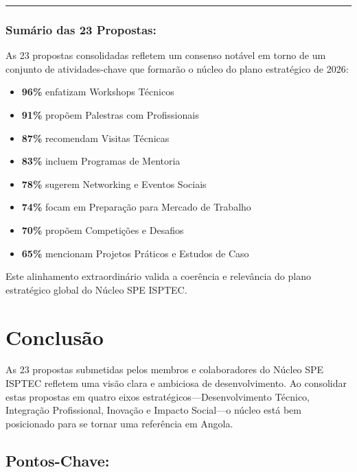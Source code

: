 \documentclass[12pt,a4paper]{article}
\begin{document}
\textcolor{spe-secondary}{\hspace{0.5cm}\rule{0.4\linewidth}{0.8pt}}

\subsubsection*{Sumário das 23 Propostas:}

As 23 propostas consolidadas refletem um consenso notável em torno de um conjunto de atividades-chave que formarão o núcleo do plano estratégico de 2026:

\begin{itemize}[itemsep=0.1cm]
    \item \textbf{96\%} enfatizam Workshops Técnicos
    \item \textbf{91\%} propõem Palestras com Profissionais
    \item \textbf{87\%} recomendam Visitas Técnicas
    \item \textbf{83\%} incluem Programas de Mentoria
    \item \textbf{78\%} sugerem Networking e Eventos Sociais
    \item \textbf{74\%} focam em Preparação para Mercado de Trabalho
    \item \textbf{70\%} propõem Competições e Desafios
    \item \textbf{65\%} mencionam Projetos Práticos e Estudos de Caso
\end{itemize}

Este alinhamento extraordinário valida a coerência e relevância do plano estratégico global do Núcleo SPE ISPTEC.

\newpage
\section{Conclusão}

As 23 propostas submetidas pelos membros e colaboradores do Núcleo SPE ISPTEC refletem uma visão clara e ambiciosa de desenvolvimento. Ao consolidar estas propostas em quatro eixos estratégicos—Desenvolvimento Técnico, Integração Profissional, Inovação e Impacto Social—o núcleo está bem posicionado para se tornar uma referência em Angola.

\subsection*{Pontos-Chave:}
\end{document}
